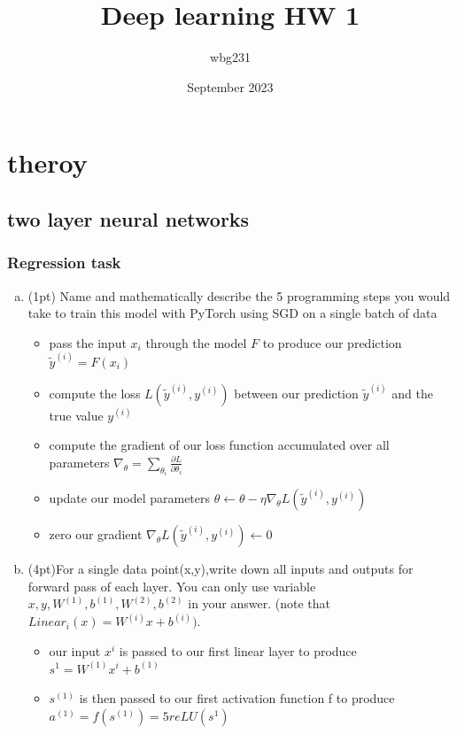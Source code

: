 \documentclass{article}
\title{Deep learning HW 1}
\author{wbg231 }
\date{September 2023}
\begin{document}
\maketitle

\section{theroy}
\subsection{two layer neural networks}
\subsubsection{Regression task}
\begin{enumerate}[(a)] %
\item (1pt) Name and mathematically describe the 5 programming steps you would take to train this model with PyTorch using SGD on a single batch of data
\begin{itemize}
    \color{blue}
    \item pass the input $x_i$ through the model $F$ to produce our prediction $\tilde{y}^{(i)}=F(x_i)$
    \item compute the loss $L(\tilde{y}^{(i)}, y^{(i)})$ between our prediction $\tilde{y}^{(i)}$ and the true value $y^{(i)}$
    \item compute the gradient of our loss function accumulated over all parameters $\nabla_{\theta}=\sum_{\theta_i}\frac{\partial L}{\partial \theta_i}$
    \item update our model parameters $\theta \leftarrow \theta - \eta \nabla_{\theta}L(\tilde{y}^{(i)}, y^{(i)})$
    \item zero our gradient $\nabla_{\theta}L(\tilde{y}^{(i)}, y^{(i)})\leftarrow 0$ 
\end{itemize}
\item (4pt)For a single data point(x,y),write down all inputs and outputs for forward pass of each layer. You can only use variable $x,y,W^{(1)},b^{(1)},W^{(2)},b^{(2)}$ in your answer. (note that $ Linear_i(x)=W^{(i)}x+b^{(i)}) $.
\begin{itemize}
    \color{blue}
    \item our input $x^i$ is passed to our first linear layer to produce $s^{1} = W^{(1)}x^{i} + b^{(1)}$
    \item $s^{(1)}$ is then passed to our first activation function f to produce $a^{(1)}=f(s^{(1)})=5reLU(s^{1})$

\end{itemize}
\end{enumerate}
\end{document}
